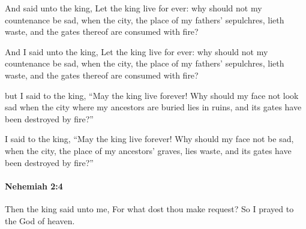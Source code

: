 			And said unto the king, Let the king live for ever: why should not my countenance be sad, when the city, the place of my fathers’ sepulchres, lieth waste, and the gates thereof are consumed with fire?

			\begin{versebox}
					\item[BHS] 
					\item[LXX] 
					\item[ASV] And I said unto the king, Let the king live for ever: why should not my countenance be sad, when the city, the place of my fathers' sepulchres, lieth waste, and the gates thereof are consumed with fire?
					\item[NIV] but I said to the king, “May the king live forever! Why should my face not look sad when the city where my ancestors are buried lies in ruins, and its gates have been destroyed by fire?”
					\item[NRSV] I said to the king, “May the king live forever! Why should my face not be sad, when the city, the place of my ancestors’ graves, lies waste, and its gates have been destroyed by fire?”
			\end{versebox}

		\paragraph{Nehemiah 2:4} %
			\label{NEHEMIAH-2-4}

			Then the king said unto me, For what dost thou make request? So I prayed to the God of heaven.

